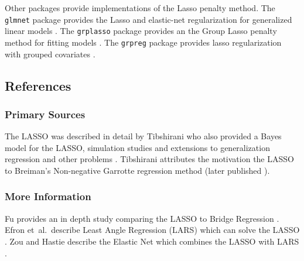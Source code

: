 Other packages provide implementations of the Lasso penalty method.
The \texttt{glmnet} package provides the Lasso and elastic-net regularization for generalized linear models \cite{Friedman2011}.
The \texttt{grplasso} package provides an the Group Lasso penalty method for fitting models \cite{Meier2009}.
The \texttt{grpreg} package provides lasso regularization with grouped covariates \cite{Brehen2011}.


\subsection{References}

\subsubsection{Primary Sources}
The LASSO was described in detail by Tibshirani who also provided a Bayes model for the LASSO, simulation studies and extensions to generalization regression and other problems \cite{Tibshirani1996}. Tibshirani attributes the motivation the LASSO to Breiman's Non-negative Garrotte regression method \cite{Breiman1993} (later published \cite{Breiman1995}).

\subsubsection{More Information}
Fu provides an in depth study comparing the LASSO to Bridge Regression \cite{Fu1998}.
Efron et~al.\ describe Least Angle Regression (LARS) which can solve the LASSO \cite{Efron2002}.
Zou and Hastie describe the Elastic Net which combines the LASSO with LARS \cite{}.

